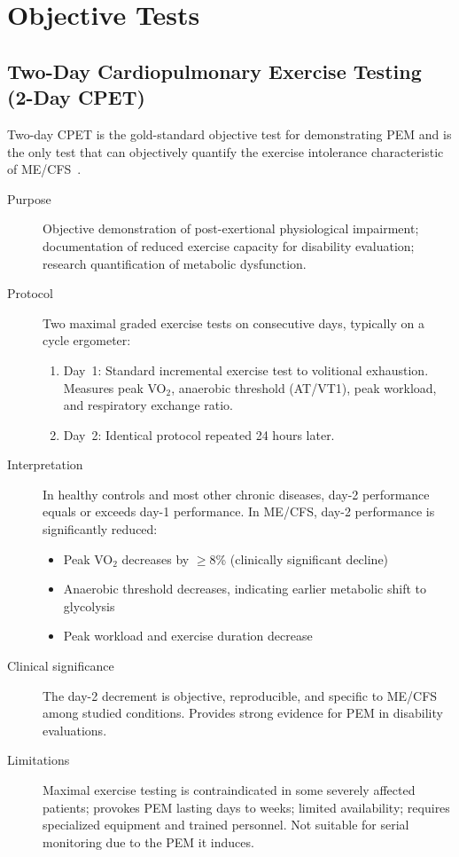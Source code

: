 \section{Objective Tests}
\label{sec:objective-tests}

\subsection{Two-Day Cardiopulmonary Exercise Testing (2-Day CPET)}

Two-day CPET is the gold-standard objective test for demonstrating PEM and is the only test that can objectively quantify the exercise intolerance characteristic of ME/CFS~\cite{keller2024cpet}.

\begin{description}
\item[Purpose] Objective demonstration of post-exertional physiological impairment; documentation of reduced exercise capacity for disability evaluation; research quantification of metabolic dysfunction.
\item[Protocol] Two maximal graded exercise tests on consecutive days, typically on a cycle ergometer:
\begin{enumerate}
    \item Day~1: Standard incremental exercise test to volitional exhaustion. Measures peak VO$_2$, anaerobic threshold (AT/VT1), peak workload, and respiratory exchange ratio.
    \item Day~2: Identical protocol repeated 24 hours later.
\end{enumerate}
\item[Interpretation] In healthy controls and most other chronic diseases, day-2 performance equals or exceeds day-1 performance. In ME/CFS, day-2 performance is significantly reduced:
\begin{itemize}
    \item Peak VO$_2$ decreases by $\geq 8$\% (clinically significant decline)
    \item Anaerobic threshold decreases, indicating earlier metabolic shift to glycolysis
    \item Peak workload and exercise duration decrease
\end{itemize}
\item[Clinical significance] The day-2 decrement is objective, reproducible, and specific to ME/CFS among studied conditions. Provides strong evidence for PEM in disability evaluations.
\item[Limitations] Maximal exercise testing is contraindicated in some severely affected patients; provokes PEM lasting days to weeks; limited availability; requires specialized equipment and trained personnel. Not suitable for serial monitoring due to the PEM it induces.
\end{description}

